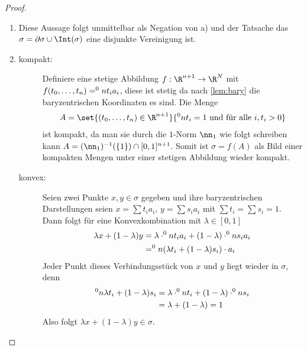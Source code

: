 \begin{Satz}
\begin{proof}
\begin{enumerate}[$a)$:]
    \item Diese Aussage folgt unmittelbar als Negation von a) und der
      Tatsache das $\sigma = \partial\sigma \cup \Int(\sigma)$ eine
      disjunkte Vereinigung ist.

    \item 
      \begin{description}
      \item[kompakt:] Definiere eine stetige Abbildung
        $f : \R^{n+1} \rightarrow \R^N$ mit
        $ f(t_0,\ldots ,t_n) = \sp{0}{n} t_i a_i$, diese ist stetig da
        nach \cref{lem:bary} die baryzentrischen Koordinaten es
        sind. Die Menge
        \begin{gather*}
          A= \set{ (t_0,\ldots,t_n) \in \R^{n+1}}{ \sp{0}{n} t_i = 1
            \text{ und für alle } i , t_i > 0}
        \end{gather*}
        ist kompakt, da man sie durch die $1$-Norm $\nn_1$ wie folgt
        schreiben kann $A = (\nn_1)^{-1}(\{ 1 \}) \cap
        [0,1]^{n+1}$.
        Somit ist $\sigma = f(A)$ als Bild einer kompakten Mengen
        unter einer stetigen Abbildung wieder kompakt.
      \item[konvex:] Seien zwei Punkte $x,y \in \sigma$ gegeben und
        ihre baryzentrischen Darstellungen seien $x = \sum t_i a_i$,
        $y = \sum s_i a_i$ mit $\sum t_i = \sum s_i = 1$. Dann folgt
        für eine Konvexkombination mit $\lambda \in [0,1]$
        \renewcommand*{\theequation}{$*$}
        \begin{align}
          \nonumber
          \lambda x + (1- \lambda)y &= \lambda \cdot \sp{0}{n} t_i a_i%
                                      + (1-\lambda) \cdot \sp{0}{n} s_i a_i \\
                                    &= \sp{0}{n} (\lambda t_i +%
                                      (1-\lambda) s_i) \cdot a_i  
        \end{align}
        Jeder Punkt dieses Verbindungsstück von $x$ und $y$ liegt
        wieder in $\sigma$, denn
        \begin{align*}
          \sp{0}{n} \lambda t_i + (1-\lambda) s_i 
          &= \lambda \cdot \sp{0}{n} t_i + (1-\lambda) \cdot \sp{0}{n} s_i \\
          &= \lambda + (1 - \lambda) = 1
        \end{align*}
        Also folgt $\lambda x + (1- \lambda)y \in \sigma$.  


\end{description}
\end{enumerate}
\end{proof}
\end{Satz}
